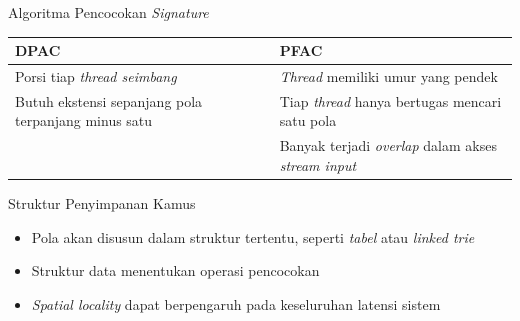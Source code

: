 \documentclass[10pt,xcolor=table]{beamer}
\begin{document}
\begin{frame}{Algoritma Pencocokan \emph{Signature}}
    \begin{table}
    \begin{tabular}{@{} p{5cm}p{5cm} @{}}
        \toprule
        DPAC & PFAC\\
        \midrule
        Porsi tiap \emph{thread seimbang} & \emph{Thread} memiliki umur yang pendek \\
        Butuh ekstensi sepanjang pola terpanjang minus satu & Tiap \emph{thread} hanya bertugas mencari satu pola\\
            & Banyak terjadi \emph{overlap} dalam akses \emph{stream input}\\
        \bottomrule
    \end{tabular}
    \end{table}
\end{frame}

\begin{frame}[fragile]{Struktur Penyimpanan Kamus}
    \begin{itemize}

        \item Pola akan disusun dalam struktur tertentu, seperti \emph{tabel} atau \emph{linked trie}
        
        \item Struktur data menentukan operasi pencocokan

        \item \emph{Spatial locality} dapat berpengaruh pada keseluruhan latensi sistem

    \end{itemize}
\end{frame}
\end{document}

